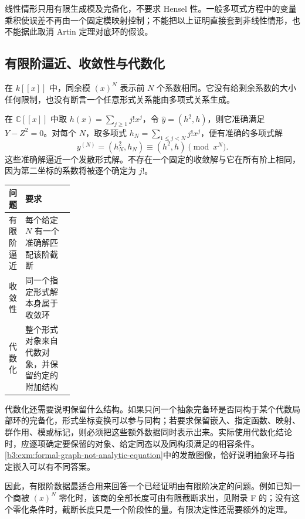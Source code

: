 线性情形只用有限生成模及完备化，不要求 Hensel 性。一般多项式方程中的变量乘积使误差不再由一个固定模映射控制；不能把以上证明直接套到非线性情形，也不能据此取消 Artin 定理对底环的假设。

\subsection{有限阶逼近、收敛性与代数化}
\label{b3:subsec:D04:03}

在 \(k[\![x]\!]\) 中，同余模 \((x)^N\) 表示前 \(N\) 个系数相同。它没有给剩余系数的大小任何限制，也没有断言一个任意形式关系能由多项式关系生成。

\begin{example}\label{b3:exm:approximation-does-not-converge}
	在 \(\mathbb C[\![x]\!]\) 中取 \(h(x)=\sum_{j\ge1}j!x^j\)，令 \(\widehat y=(h^2,h)\)，则它准确满足 \(Y-Z^2=0\)。对每个 \(N\)，取多项式 \(h_N=\sum_{1\le j<N}j!x^j\)，便有准确的多项式解
	\[
		y^{(N)}=(h_N^2,h_N) \equiv(h^2,h)\pmod{x^N}.
	\]
	这些准确解逼近一个发散形式解。不存在一个固定的收敛解与它在所有阶上相同，因为第二坐标的系数将被逐个确定为 \(j!\)。
\end{example}

\begin{center}
	\begin{tabularx}{\linewidth}{@{}>{\raggedright\arraybackslash}p{0.22\linewidth}X@{}}
		\toprule
		问题 & 要求 \\
		\midrule
		有限阶逼近 & 每个给定 \(N\) 有一个准确解匹配该阶截断 \\
		收敛性 & 同一个指定形式解本身属于收敛环 \\
		代数化 & 整个形式对象来自代数对象，并保留约定的附加结构 \\
		\bottomrule
	\end{tabularx}
\end{center}

代数化还需要说明保留什么结构。如果只问一个抽象完备环是否同构于某个代数局部环的完备化，形式坐标变换可以参与同构；若要求保留嵌入、指定函数、映射、群作用、模或标记，则必须把这些额外数据同时表示出来。实际使用代数化结论时，应逐项确定要保留的对象、给定同态以及同构须满足的相容条件。\cref{b3:exm:formal-graph-not-analytic-equation}中的发散图像，恰好说明抽象环与指定嵌入可以有不同答案。

\ProseParagraphBreak
因此，有限阶数据最适合用来回答一个已经证明由有限阶决定的问题。例如已知一个商被 \((x)^N\) 零化时，该商的全部长度可由有限截断求出，见附录 F 的；没有这个零化条件时，截断长度只是一个阶段性的量。有限决定性还需要额外的定理。

